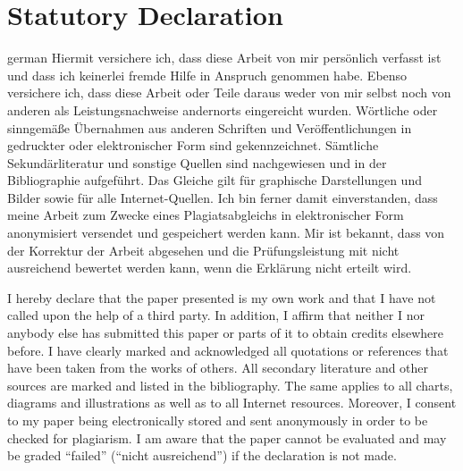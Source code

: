 \newpage %
\thispagestyle{empty} %
\section*{Statutory Declaration} %

\begin{otherlanguage}
	{german} Hiermit versichere ich, dass diese Arbeit von mir pers\"{o}nlich verfasst
	ist und dass ich keinerlei fremde Hilfe in Anspruch genommen habe. Ebenso
	versichere ich, dass diese Arbeit oder Teile daraus weder von mir selbst noch von
	anderen als Leistungsnachweise andernorts eingereicht wurden. W\"{o}rtliche oder
	sinngem\"{a}{\ss}e \"{U}bernahmen aus anderen Schriften und Ver\"{o}ffentlichungen
	in gedruckter oder elektronischer Form sind gekennzeichnet. S\"{a}mtliche
	Sekund\"{a}rliteratur und sonstige Quellen sind nachgewiesen und in der Bibliographie
	aufgef\"{u}hrt. Das Gleiche gilt f\"{u}r graphische Darstellungen und Bilder
	sowie f\"{u}r alle Internet-Quellen. Ich bin ferner damit einverstanden, dass meine
	Arbeit zum Zwecke eines Plagiatsabgleichs in elektronischer Form anonymisiert versendet
	und gespeichert werden kann. Mir ist bekannt, dass von der Korrektur der Arbeit
	abgesehen und die Pr\"{u}fungsleistung mit nicht ausreichend bewertet werden
	kann, wenn die Erkl\"{a}rung nicht erteilt wird.
\end{otherlanguage}

\vspace*{1in} %

\noindent
I hereby declare that the paper presented is my own work and that I have not called
upon the help of a third party. In addition, I affirm that neither I nor anybody
else has submitted this paper or parts of it to obtain credits elsewhere before.
I have clearly marked and acknowledged all quotations or references that have
been taken from the works of others. All secondary literature and other sources are
marked and listed in the bibliography. The same applies to all charts, diagrams and
illustrations as well as to all Internet resources. Moreover, I consent to my paper
being electronically stored and sent anonymously in order to be checked for plagiarism.
I am aware that the paper cannot be evaluated and may be graded ``failed'' (``nicht
ausreichend'') if the declaration is not made.\\


\hfill \signature{}